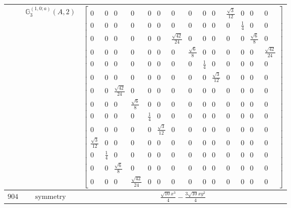 \documentclass[fleqn,8pt,landscape]{jsarticle}
\begin{document}
\begin{longtable}{ccc}
$  $ & $ \mathbb{G}_{3}^{(1,0;a)}(A,2) $ & $ \begin{bmatrix} 0 & 0 & 0 & 0 & 0 & 0 & 0 & 0 & 0 & 0 & \frac{\sqrt{3}}{12} & 0 & 0 & 0 \\ 0 & 0 & 0 & 0 & 0 & 0 & 0 & 0 & 0 & 0 & 0 & \frac{1}{4} & 0 & 0 \\ 0 & 0 & 0 & 0 & 0 & 0 & \frac{\sqrt{42}}{24} & 0 & 0 & 0 & 0 & 0 & \frac{\sqrt{6}}{8} & 0 \\ 0 & 0 & 0 & 0 & 0 & 0 & 0 & \frac{\sqrt{6}}{8} & 0 & 0 & 0 & 0 & 0 & \frac{\sqrt{42}}{24} \\ 0 & 0 & 0 & 0 & 0 & 0 & 0 & 0 & \frac{1}{4} & 0 & 0 & 0 & 0 & 0 \\ 0 & 0 & 0 & 0 & 0 & 0 & 0 & 0 & 0 & \frac{\sqrt{3}}{12} & 0 & 0 & 0 & 0 \\ 0 & 0 & \frac{\sqrt{42}}{24} & 0 & 0 & 0 & 0 & 0 & 0 & 0 & 0 & 0 & 0 & 0 \\ 0 & 0 & 0 & \frac{\sqrt{6}}{8} & 0 & 0 & 0 & 0 & 0 & 0 & 0 & 0 & 0 & 0 \\ 0 & 0 & 0 & 0 & \frac{1}{4} & 0 & 0 & 0 & 0 & 0 & 0 & 0 & 0 & 0 \\ 0 & 0 & 0 & 0 & 0 & \frac{\sqrt{3}}{12} & 0 & 0 & 0 & 0 & 0 & 0 & 0 & 0 \\ \frac{\sqrt{3}}{12} & 0 & 0 & 0 & 0 & 0 & 0 & 0 & 0 & 0 & 0 & 0 & 0 & 0 \\ 0 & \frac{1}{4} & 0 & 0 & 0 & 0 & 0 & 0 & 0 & 0 & 0 & 0 & 0 & 0 \\ 0 & 0 & \frac{\sqrt{6}}{8} & 0 & 0 & 0 & 0 & 0 & 0 & 0 & 0 & 0 & 0 & 0 \\ 0 & 0 & 0 & \frac{\sqrt{42}}{24} & 0 & 0 & 0 & 0 & 0 & 0 & 0 & 0 & 0 & 0 \end{bmatrix} $ \\ \hline
$ 904 $ & $ \text{symmetry} $ & $ \frac{\sqrt{10} x^{3}}{4} - \frac{3 \sqrt{10} x y^{2}}{4} $ \\

\end{longtable}
\end{document}

